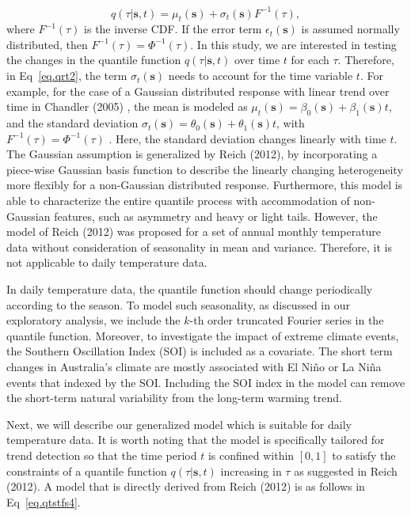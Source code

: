 \documentclass[fleqn,10pt]{wlscirep}
\newcommand{\bs}{\mathbf{s}}
\begin{document}
\begin{equation}\label{eq.qrt2}
	q(\tau |\bs,t) = \mu_{t}(\bs)+\sigma_t(\bs)F^{-1}(\tau),
\end{equation}
where $F^{-1}(\tau)$ is the inverse CDF. If the error term $\epsilon_t(\bs)$ is assumed normally distributed, then $F^{-1}(\tau) = \Phi^{-1}(\tau)$. In this study, we are interested in testing the changes in the quantile function $q(\tau |\bs,t)$ over time $t$ for each $\tau$. Therefore, in  Eq~\eqref{eq.qrt2}, the term  $\sigma_t(\bs)$ needs to account for the time variable $t$. For example, for the case of a Gaussian distributed response with linear trend over time in Chandler (2005) ,   the mean  is modeled as $\mu_{t}(\bs) = \beta_0(\bs)+\beta_1(\bs)t$, and the standard deviation $\sigma_t(\bs) = \theta_0(\bs) + \theta_1(\bs) t$, with $F^{-1}(\tau) = \Phi^{-1}(\tau)$ \cite{Chandler2005}. Here, the standard deviation changes linearly with time $t$.
The Gaussian assumption is generalized by Reich (2012), by incorporating a piece-wise Gaussian basis function to describe the linearly changing heterogeneity more flexibly for a non-Gaussian distributed response\cite{Brian2013}. Furthermore, this model is able to characterize the entire quantile process with accommodation of non-Gaussian features, such as asymmetry and heavy or light tails. However, the model of Reich (2012) was  proposed for a set of annual monthly temperature data without consideration of seasonality in mean and variance. Therefore, it is not applicable to daily temperature data.

In daily temperature data, the quantile function should change periodically according to the season. To model such seasonality, as discussed in our exploratory analysis, we include the $k$-th order truncated Fourier series in the quantile function. Moreover, to investigate the impact of extreme climate events, the Southern Oscillation Index (SOI) is included as a covariate. The short term changes in Australia's climate are mostly associated with  El Niño or La Niña events that indexed by the SOI.  Including the SOI index in the model can remove the short-term natural variability from the long-term warming trend.

Next, we will describe our generalized model which is suitable for daily temperature data. It is worth noting that the model is specifically tailored for trend detection so that the time period $t$ is confined within $[0,1]$ to satisfy the constraints of a quantile function $q(\tau|\bs,t)$ increasing in $\tau$ as suggested in Reich (2012).  A model that is directly derived from Reich (2012)  is as follows in Eq~\eqref{eq.qtstfs4}.
\end{document}
